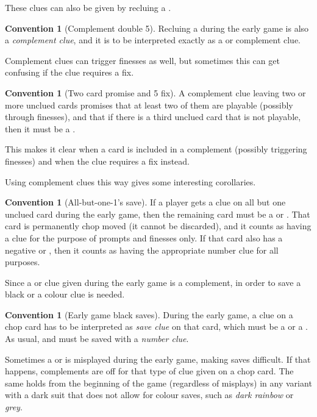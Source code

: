 \documentclass[a4paper]{article}
\theoremstyle{plain}
\theoremstyle{definition}
\newtheorem{convention}[theorem]{Convention}
\begin{document}
These clues can also be given by recluing a .

\begin{convention}[Complement double 5]
	Recluing a  during the early game is also a \emph{complement clue}, and it is to be interpreted exactly as a  or  complement clue.
\end{convention}

Complement clues can trigger finesses as well, but sometimes this can get confusing if the clue requires a fix.

\begin{convention}[Two card promise and 5 fix]
	A complement clue leaving two or more unclued cards promises that at least two of them are playable (possibly through finesses), and that if there is a third unclued card that is not playable, then it must be a .
\end{convention}

This makes it clear when a card is included in a complement (possibly triggering finesses) and when the clue requires a fix instead.

Using complement clues this way gives some interesting corollaries.

\begin{convention}[All-but-one-1's save]
	If a player gets a  clue on all but one unclued card during the early game, then the remaining card must be a  or . That card is permanently chop moved (it cannot be discarded), and it counts as having a  clue for the purpose of prompts and finesses only. If that card also has a negative  or , then it counts as having the appropriate number clue for all purposes.
\end{convention}

Since a  or  clue given during the early game is a complement, in order to save a black  or  a colour clue is needed.

\begin{convention}[Early game black saves]
	During the early game, a  clue on a chop card has to be interpreted as \emph{save clue} on that card, which must be a  or a . As usual,  and  must be saved with a \emph{number clue}.
\end{convention}

Sometimes a  or  is misplayed during the early game, making saves difficult. If that happens, complements are off for that type of clue given on a chop card. The same holds from the beginning of the game (regardless of misplays) in any variant with a dark suit that does not allow for colour saves, such as \emph{dark rainbow} or \emph{grey}.
\end{document}
